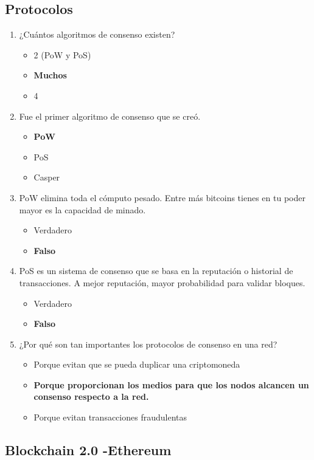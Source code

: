 \documentclass[a4paper,12pt]{lib/pub}
\begin{document}
\subsection{Protocolos}
\begin{enumerate}
	\item ¿Cuántos algoritmos de consenso existen?
	\begin{itemize}
		\item 2 (PoW y PoS)
		\item \textbf{Muchos}
		\item 4
	\end{itemize}
	\item Fue el primer algoritmo de consenso que se creó.
	\begin{itemize}
		\item \textbf{PoW}
		\item PoS
		\item Casper
	\end{itemize}
	\item PoW elimina toda el cómputo pesado. Entre más bitcoins tienes en tu poder mayor es la capacidad de minado.
	\begin{itemize}
		\item Verdadero
		\item \textbf{Falso}
	\end{itemize}
	\item PoS es un sistema de consenso que se basa en la reputación o historial de transacciones. A mejor reputación, mayor probabilidad para validar bloques.
	\begin{itemize}
		\item Verdadero
		\item \textbf{Falso}
	\end{itemize}
	\item ¿Por qué son tan importantes los protocolos de consenso en una red?
	\begin{itemize}
		\item Porque evitan que se pueda duplicar una criptomoneda
		\item \textbf{Porque proporcionan los medios para que los nodos alcancen un consenso respecto a la red.}
		\item Porque evitan transacciones fraudulentas
	\end{itemize}
\end{enumerate}
\subsection{Blockchain 2.0 -Ethereum}
\end{document}

